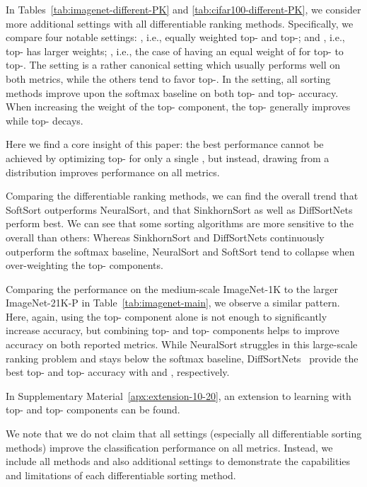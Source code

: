 \documentclass{article}
\begin{document}
\begin{table}[t]
In Tables~\ref{tab:imagenet-different-PK} and \ref{tab:cifar100-different-PK}, we consider more additional settings with all differentiable ranking methods.
Specifically, we compare four notable settings:
, i.e., equally weighted top- and top-;  and , i.e., top- has larger weights; , i.e., the case of having an equal weight of  for top- to top-.
The  setting is a rather canonical setting which usually performs well on both metrics, while the others tend to favor top-.
In the  setting, all sorting methods improve upon the softmax baseline on both top- and top- accuracy.
When increasing the weight of the top- component, the top- generally improves while top- decays.

Here we find a core insight of this paper: the best performance cannot be achieved by optimizing top- for only a single , but instead, drawing  from a distribution improves performance on all metrics.

Comparing the differentiable ranking methods, we can find the overall trend that SoftSort outperforms NeuralSort, and that SinkhornSort as well as DiffSortNets perform best.
We can see that some sorting algorithms are more sensitive to the overall  than others:
Whereas SinkhornSort \citep{Cuturi2019-SortingOT} and DiffSortNets \citep{Petersen2021-diffsort} continuously outperform the softmax baseline, NeuralSort \citep{Grover2019-NeuralSort} and SoftSort \citep{prillo2020softsort} tend to collapse when over-weighting the top- components.




Comparing the performance on the medium-scale ImageNet-1K to the larger ImageNet-21K-P in Table~\ref{tab:imagenet-main}, we observe a similar pattern. 
Here, again, using the top- component alone is not enough to significantly increase accuracy, but combining top- and top- components helps to improve accuracy on both reported metrics. 
While NeuralSort struggles in this large-scale ranking problem and stays below the softmax baseline, DiffSortNets~\citep{Petersen2021-diffsort} provide the best top- and top- accuracy with  and , respectively.

In Supplementary Material~\ref{apx:extension-10-20}, an extension to learning with top- and top- components can be found. 

We note that we do not claim that all settings (especially all differentiable sorting methods) improve the classification performance on all metrics. 
Instead, we include all methods and also additional settings to demonstrate the capabilities and limitations of each differentiable sorting method.


\end{table}
\end{document}
